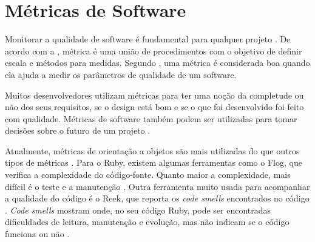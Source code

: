 \section{Métricas de Software}

Monitorar a qualidade de software é fundamental para qualquer projeto \cite{prmm}. De acordo com a , métrica é uma união de procedimentos com o objetivo de definir escala e métodos para medidas. Segundo , uma métrica é considerada boa quando ela ajuda a medir os parâmetros de qualidade de um software. 

Muitos desenvolvedores utilizam métricas para ter uma noção da completude ou não dos seus requisitos, se o design está bom e se o que foi desenvolvido foi feito com qualidade. Métricas de software também podem ser utilizadas para tomar decisões sobre o futuro de um projeto \cite{metrics-book}.

Atualmente, métricas de orientação a objetos são mais utilizadas do que outros tipos de métricas \cite{danijel}. Para o Ruby, existem algumas ferramentas como o Flog, que verifica a complexidade do código-fonte. Quanto maior a complexidade, mais difícil é o teste e a manutenção \cite{flog}. Outra ferramenta muito usada para acompanhar a qualidade do código é o Reek, que reporta os \textit{code smells} encontrados no código \cite{reek}. \textit{Code smells} mostram onde, no seu código Ruby, pode ser encontradas dificuldades de leitura, manutenção e evolução, mas não indicam se o código funciona ou não \cite{codesmells}.
